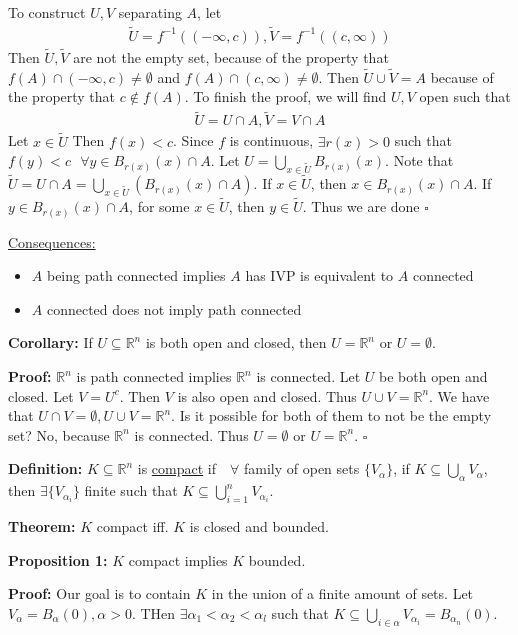 \documentclass{article}
\newcommand*{\qed}{\hfill$\square$}%
\newcommand*{\txt}[1]{\text{ #1 }}%
\newcommand*{\fora}{\txt{}\forall}%
\newcommand*{\rr}{\mathbb{R}}%
\begin{document}
To construct $U,V$ separating $A$, let \begin{align*}
    \tilde{U}=f^{-1}((-\infty,c)), \tilde{V}=f^{-1}((c,\infty))
\end{align*}
Then $\tilde{U},\tilde{V}$ are not the empty set, because of the property that $f(A)\cap (-\infty,c)\neq \emptyset$ and $f(A)\cap (c,\infty)\neq \emptyset$. Then $\tilde{U}\cup \tilde{V}=A$ because of the property that $c\notin f(A)$. To finish the proof, we will find $U,V$ open such that \begin{align*}
    \tilde{U}=U\cap A,\tilde{V}=V\cap A
\end{align*}
Let $x\in \tilde{U}$ Then $f(x)<c$. Since $f$ is continuous, $\exists r(x)>0$ such that $f(y)<c \fora y\in B_{r(x)}(x)\cap A$. Let $U=\bigcup_{x\in \tilde{U}}B_{r(x)}(x)$. Note that $\tilde{U}=U\cap A=\bigcup_{x\in \tilde{U}}(B_{r(x)}(x)\cap A)$. If $x\in \tilde{U}$, then $x\in B_{r(x)}(x)\cap A$. If $y\in B_{r(x)}(x)\cap A$, for some $x\in \tilde{U}$, then $y\in \tilde{U}$. Thus we are done \qed 

\underline{Consequences:}\begin{itemize}
    \item $A$ being path connected implies $A$ has IVP is equivalent to $A$ connected 
    \item $A$ connected does not imply path connected
\end{itemize}

\textbf{Corollary:} If $U\subseteq \rr^n$ is both open and closed, then $U=\rr^n$ or $U=\emptyset$.

\textbf{Proof:} $\rr^n$ is path connected implies $\rr^n$ is connected. Let $U$ be both open and closed. Let $V=U^c$. Then $V$ is also open and closed. Thus $U\cup V=\rr^n$. We have that $U\cap V=\emptyset, U\cup V=\rr^n$. Is it possible for both of them to not be the empty set? No, because $\rr^n$ is connected. Thus $U=\emptyset$ or $U=\rr^n$. \qed

\textbf{Definition:} $K\subseteq \rr^n$ is \underline{compact} if $\fora$ family of open sets $\{V_\alpha\}$, if $K\subseteq \bigcup_{\alpha}V_\alpha$, then $\exists \{V_{\alpha_i}\}$ finite such that $K\subseteq \bigcup_{i=1}^n V_{\alpha_i}$.

\textbf{Theorem:} $K$ compact iff. $K$ is closed and bounded. 

\textbf{Proposition 1:} $K$ compact implies $K$ bounded. 

\textbf{Proof:} Our goal is to contain $K$ in the union of a finite amount of sets. Let $V_\alpha=B_\alpha(0), \alpha>0$. THen $\exists \alpha_1<\alpha_2<\alpha_l$ such that $K\subseteq \bigcup_{i\in\alpha}V_{\alpha_i}=B_{\alpha_n}(0)$.
\end{document}
